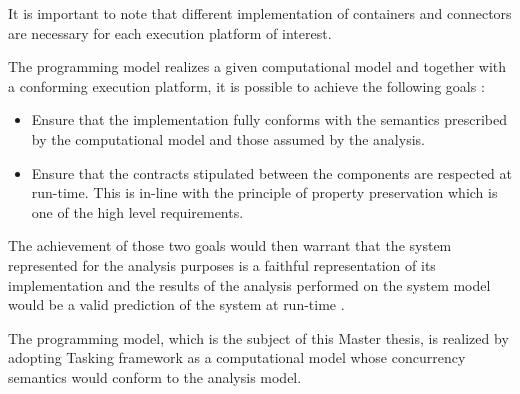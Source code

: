 It is important to note that different implementation of containers and connectors are necessary for each execution platform of interest.

The programming model realizes a given computational model and together with a conforming execution platform, it is possible to achieve the following goals \cite{PhdThesis}:

\begin{itemize}
\item Ensure that the implementation fully conforms with the semantics prescribed by the computational model and those assumed by the analysis.
\item Ensure that the contracts stipulated between the components are respected at run-time. This is in-line with the principle of property preservation which is one of the high level requirements.
\end{itemize} 

The achievement of those two goals would then warrant that the system represented for the analysis purposes is a faithful representation of its implementation and the results of the analysis performed on the system model would be a valid prediction of the system at run-time \cite{PhdThesis}.

The programming model, which is the subject of this Master thesis, is realized by adopting Tasking framework as a computational model whose concurrency semantics would conform to the analysis model.     

